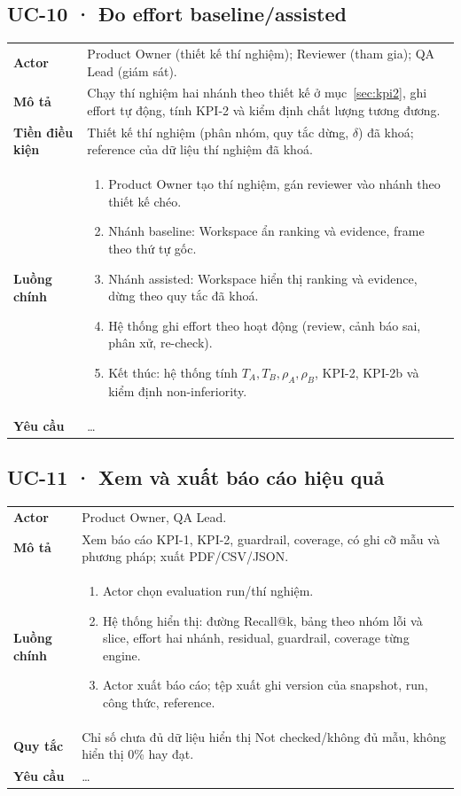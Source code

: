 \subsection*{UC-10 · Đo effort baseline/assisted}
\begin{xltabular}{\linewidth}{@{}>{\bfseries}L{3.2cm}Y@{}}
\toprule
Actor & Product Owner (thiết kế thí nghiệm); Reviewer (tham gia); QA Lead (giám sát).\\
Mô tả & Chạy thí nghiệm hai nhánh theo thiết kế ở mục~\ref{sec:kpi2}, ghi effort tự động, tính KPI-2 và kiểm định chất lượng tương đương.\\
Tiền điều kiện & Thiết kế thí nghiệm (phân nhóm, quy tắc dừng, \(\delta\)) đã khoá; reference của dữ liệu thí nghiệm đã khoá.\\
Luồng chính &
\begin{enumerate}[nosep]
  \item Product Owner tạo thí nghiệm, gán reviewer vào nhánh theo thiết kế chéo.
  \item Nhánh baseline: Workspace ẩn ranking và evidence, frame theo thứ tự gốc.
  \item Nhánh assisted: Workspace hiển thị ranking và evidence, dừng theo quy tắc đã khoá.
  \item Hệ thống ghi effort theo hoạt động (review, cảnh báo sai, phân xử, re-check).
  \item Kết thúc: hệ thống tính \(T_A, T_B, \rho_A, \rho_B\), KPI-2, KPI-2b và kiểm định non-inferiority.
\end{enumerate}\\
Yêu cầu & …\\
\bottomrule
\end{xltabular}

\subsection*{UC-11 · Xem và xuất báo cáo hiệu quả}
\begin{xltabular}{\linewidth}{@{}>{\bfseries}L{3.2cm}Y@{}}
\toprule
Actor & Product Owner, QA Lead.\\
Mô tả & Xem báo cáo KPI-1, KPI-2, guardrail, coverage, có ghi cỡ mẫu và phương pháp; xuất PDF/CSV/JSON.\\
Luồng chính &
\begin{enumerate}[nosep]
  \item Actor chọn evaluation run/thí nghiệm.
  \item Hệ thống hiển thị: đường Recall@k, bảng theo nhóm lỗi và slice, effort hai nhánh, residual, guardrail, coverage từng engine.
  \item Actor xuất báo cáo; tệp xuất ghi version của snapshot, run, công thức, reference.
\end{enumerate}\\
Quy tắc & Chỉ số chưa đủ dữ liệu hiển thị Not checked/không đủ mẫu, không hiển thị 0\% hay đạt.\\
Yêu cầu & …\\
\bottomrule
\end{xltabular}

